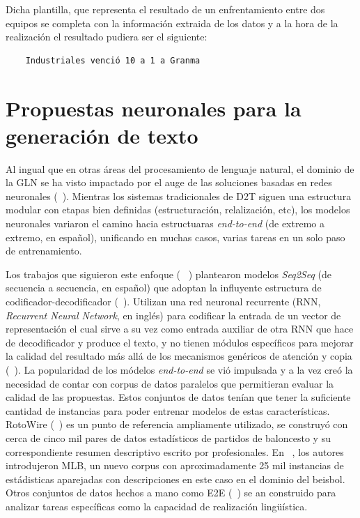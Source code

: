     Dicha plantilla, que representa el resultado de un enfrentamiento entre dos equipos se completa con la información extraida de los datos y a la hora de 
la realización el resultado pudiera ser el siguiente:

\begin{verbatim}
    Industriales venció 10 a 1 a Granma
\end{verbatim}

\section{Propuestas neuronales para la generación de texto}
    Al ingual que en otras áreas del procesamiento de lenguaje natural, el dominio de la GLN se ha visto 
impactado por el auge de las soluciones basadas en redes neuronales (~\cite{Gatt2018SurveyOT,sharma2022innovations}). 
Mientras los sistemas tradicionales de D2T siguen una estructura modular con etapas bien definidas (estructuración, relalización, etc), 
los modelos neuronales variaron el camino hacia estructuaras \emph{end-to-end} (de extremo a extremo, en español), unificando 
en muchas casos, varias tareas en un solo paso de entrenamiento.

    Los trabajos que siguieron este enfoque (~\cite{lebret-etal-2016-neural,mei2016talk,wiseman-etal-2017-challenges} ) plantearon modelos \emph{Seq2Seq} (de secuencia a secuencia, en español) que adoptan la 
influyente estructura de codificador-decodificador (~\cite{sutskever2014sequence}). Utilizan una red neuronal recurrente (RNN, \emph{Recurrent Neural Network}, en inglés) 
para codificar la entrada de un vector de representación el cual sirve a su vez como entrada auxiliar de otra RNN que hace de decodificador y produce el texto, y no tienen módulos 
específicos para mejorar la calidad del resultado más allá de los mecanismos gen\'ericos de atención y copia (~\cite{bahdanau2014neural,gu2016incorporating}). La popularidad de los módelos 
\emph{end-to-end} se vió impulsada y a la vez creó la necesidad de contar con corpus de datos paralelos que permitieran evaluar la calidad de las propuestas. Estos conjuntos de datos tenían que 
tener la suficiente cantidad de instancias para poder entrenar modelos de estas características. RotoWire (~\cite{wiseman-etal-2017-challenges}) es un punto de referencia ampliamente utilizado, se construyó con cerca de 
cinco mil pares de datos estadísticos de partidos de baloncesto y su correspondiente resumen descriptivo escrito por profesionales. En ~\cite{puduppully2019data}, los autores introdujeron MLB, un nuevo corpus con aproximadamente 
25 mil instancias de estádisticas aparejadas con descripciones en este caso en el dominio del beisbol. Otros conjuntos de datos hechos a mano como E2E (~\cite{novikova2017e2e}) se an construido para analizar tareas espec\'ificas 
como la capacidad de realización lingüística.

